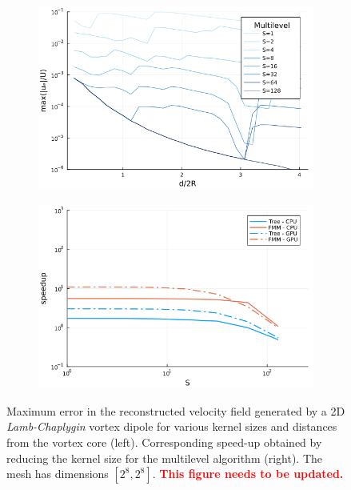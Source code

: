 \documentclass[final,1p,times]{elsarticle}
\begin{document}
\begin{figure}
    \centering
    \begin{subfigure}{.5\textwidth}
        \centering
        \includegraphics[width=\textwidth]{tex//fig/lamb_dipole_error_dists.png}
    \end{subfigure}%
    \begin{subfigure}{.5\textwidth}
        \centering
        \includegraphics[width=\textwidth]{tex/fig/lamb_dipole_speedup.png}
    \end{subfigure}
    \caption{Maximum error in the reconstructed velocity field generated by a 2D \emph{Lamb-Chaplygin} vortex dipole for various kernel sizes and distances from the vortex core (left). Corresponding speed-up obtained by reducing the kernel size for the multilevel algorithm (right). The mesh has dimensions $[2^8,2^8]$. \textcolor{red}{\textbf{This figure needs to be updated.}}}
    \label{fig:error_lamb_2}
\end{figure}
\end{document}
